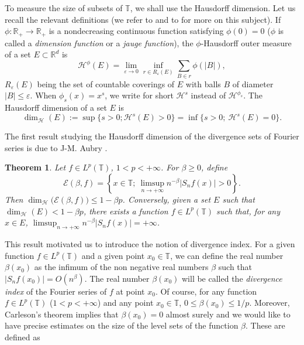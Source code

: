 \documentclass[11pt,a4paper]{amsart}
\theoremstyle{plain}
\newtheorem{theorem}{Theorem}[section]
\begin{document}
\smallskip

To measure the size of subsets of ${\mathbb T}$, 
we shall use the Hausdorff dimension. Let us recall the relevant definitions (we refer to \cite{Falc} and to \cite{Mat95} for more on this subject). 
If $\phi:\mathbb R_+\to\mathbb R_+$ is a nondecreasing continuous function
satisfying $\phi(0)=0$ ($\phi$ is called a \emph{dimension function} or a \emph{jauge function}),
the $\phi$-Hausdorff outer measure of a set $E\subset \mathbb R^d$ is 
$$\mathcal H^{\phi}(E)=\lim_{{\varepsilon}\to 0}\inf_{r\in R_{\varepsilon}(E)}\sum_{B\in r}\phi(|B|),$$
$R_{\varepsilon}(E)$ being the set of countable coverings of $E$ with balls $B$ of diameter $|B|\leq{\varepsilon}$. 
When $\phi_s(x)=x^s$, we write for short $\mathcal H^s$ instead of $\mathcal H^{\phi_s}$. The Hausdorff dimension of a set $E$
is 
$$\dim_{\mathcal H}(E):=\sup\{s>0; \mathcal H^s (E)>0\}=\inf\{s>0;\ \mathcal H^s(E)=0\}.$$

The first result studying the Hausdorff dimension of the divergence sets of
 Fourier series is due to J-M. Aubry \cite{Aub06}.

\begin{theorem}\label{THMAUBRY}
Let $f\in L^p(\mathbb T)$, $1<p<+\infty$. For $\beta\geq 0$, define
$$\mathcal E(\beta,f)=\left\{x\in\mathbb T;\ \limsup_{n\to+\infty}n^{-\beta}|S_nf(x)|>0\right\}.$$
Then $\dim_\mathcal{H}\big(\mathcal E(\beta,f)\big)\leq 1-\beta p$. Conversely, given a set $E$ such that $\dim_\mathcal{H}(E)<1-\beta p$, there exists
a function $f\in L^p(\mathbb T)$ such that, for any $x\in E$,
$\displaystyle\limsup_{n\to +\infty}n^{-\beta}|S_nf(x)|=+\infty$.
\end{theorem}

This result motivated us to introduce the notion of divergence index. For a
given function $f\in L^p({\mathbb T})$ and a given point $x_0\in {\mathbb T}$, we can define
the real number $\beta(x_0)$ as the infimum of the non negative real numbers
$\beta$ such that $|S_nf(x_0)|=O(n^\beta)$. The real number $\beta(x_0)$ will
be called the \emph{divergence index} of the Fourier series of $f$ 
at point $x_0$. Of
course, for any function $f\in L^p({\mathbb T})$ ($1<p<+\infty$) and any point $x_0\in{\mathbb T}$, $0\le
\beta(x_0)\le 1/p$. Moreover, Carleson's theorem implies that $\beta(x_0)=0$
almost surely and we would like to have precise estimates on the size of the level sets of the function
$\beta$. These are defined as
\end{document}
